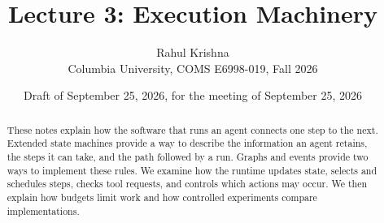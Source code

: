 \documentclass[9pt,twocolumn]{extarticle}
\title{Lecture 3: Execution Machinery}
\author{Rahul Krishna\\Columbia University, COMS E6998-019, Fall 2026}
\date{Draft of September 25, 2026, for the meeting of September 25, 2026}
\theoremstyle{definition}
\begin{document}
\maketitle
\begin{abstract}
These notes explain how the software that runs an agent connects one step to the next. Extended
state machines provide a way to describe the information an agent retains, the steps it can take,
and the path followed by a run. Graphs and events provide two ways to implement these rules. We
examine how the runtime updates state, selects and schedules steps, checks tool requests, and
controls which actions may occur. We then explain how budgets limit work and how controlled
experiments compare implementations.
\end{abstract}
\tableofcontents














\clearpage
\appendix
\raggedbottom

\clearpage

\end{document}

